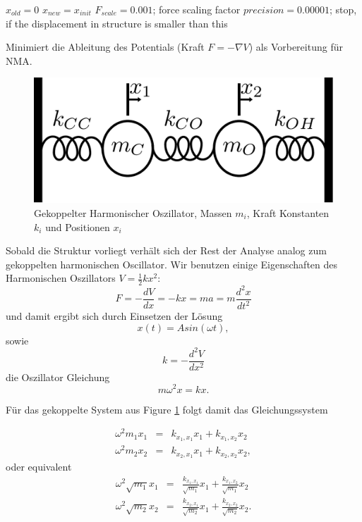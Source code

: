 \documentclass[a4paper,12pt]{article}
\begin{document}
\begin{algorithm}[H]
 \SetAlgoLined
 $x_{old} = 0$\;
 $x_{new} = x_{init}$\;
 $F_{scale} = 0.001$;  force scaling factor\;
 $precision = 0.00001$; stop, if the displacement in structure is smaller than this\;	
 \caption{Minimiert die Ableitung des Potentials (Kraft $F=-\nabla V$) als Vorbereitung für NMA. }
\end{algorithm}
\begin{figure}[ht!]
 \centering
 \includegraphics[scale=0.5,keepaspectratio=true]{./nma.pdf}
 \caption{Gekoppelter Harmonischer Oszillator, Massen $m_i$, Kraft Konstanten $k_i$ und Positionen $x_i$}
 \label{fig:hos}
\end{figure}
Sobald die Struktur vorliegt verhält sich der Rest der Analyse analog zum gekoppelten harmonischen Oscillator.
Wir benutzen einige Eigenschaften des Harmonischen Oszillators $V=\frac{1}{2}kx^2$:
\begin{equation}
 F=-\frac{dV}{dx}=-kx=ma=m\frac{d^2x}{dt^2}
\end{equation}
und damit ergibt sich durch Einsetzen der Lösung
\begin{equation}
 x(t)=Asin(\omega t),
\end{equation}
sowie
\begin{equation}
 k=-\frac{d^2V}{dx^2}
\end{equation}
die Oszillator Gleichung
\begin{equation}
 m \omega^2 x = k x.
\end{equation}

Für das gekoppelte System aus Figure \ref{fig:hos} folgt damit das Gleichungssystem

\begin{eqnarray}
 \omega^2 m_1 x_1 &=& k_{x_1,x_1} x_1 +k_{x_1,x_2} x_2\\
 \omega^2 m_2 x_2 &=& k_{x_2,x_1} x_1 +k_{x_2,x_2} x_2,
\end{eqnarray}
oder equivalent 
\begin{eqnarray}
 \omega^2 \sqrt{m_1} x_1 &=& \frac{ k_{x_1,x_1} }{ \sqrt{m_1} } x_1 +\frac{ k_{x_1,x_2} }{ \sqrt{m_1} } x_2\\
 \omega^2 \sqrt{m_2} x_2 &=& \frac{ k_{x_2,x_1} }{ \sqrt{m_2} } x_1 +\frac{ k_{x_2,x_2} }{ \sqrt{m_2} } x_2.
\end{eqnarray}
\end{document}
